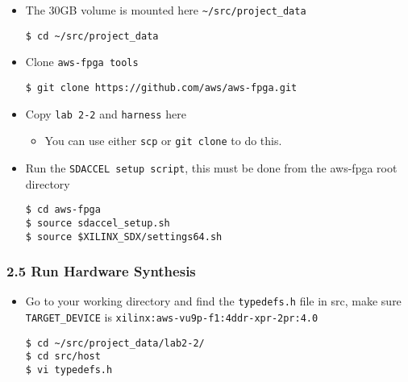 \documentclass[]{article}
\begin{document}
\begin{itemize}
\item
  The 30GB volume is mounted here
  \texttt{\textasciitilde{}/src/project\_data}

\begin{verbatim}
$ cd ~/src/project_data
\end{verbatim}
\end{itemize}

\begin{itemize}
\item
  Clone \texttt{aws-fpga\ tools}

\begin{verbatim}
$ git clone https://github.com/aws/aws-fpga.git
\end{verbatim}
\end{itemize}

\begin{itemize}
\item
  Copy \texttt{lab\ 2-2} and \texttt{harness} here

  \begin{itemize}
  \item
    You can use either \texttt{scp} or \texttt{git\ clone} to do this.
  \end{itemize}
\item
  Run the \texttt{SDACCEL\ setup\ script}, this must be done from the
  aws-fpga root directory

\begin{verbatim}
$ cd aws-fpga
$ source sdaccel_setup.sh
$ source $XILINX_SDX/settings64.sh
\end{verbatim}
\end{itemize}

\hypertarget{header-n299}{%
\subsubsection{2.5 Run Hardware Synthesis}\label{header-n299}}

\begin{itemize}
\item
  Go to your working directory and find the \texttt{typedefs.h} file in
  src, make sure \texttt{TARGET\_DEVICE} is
  \texttt{xilinx:aws-vu9p-f1:4ddr-xpr-2pr:4.0}

\begin{verbatim}
$ cd ~/src/project_data/lab2-2/
$ cd src/host
$ vi typedefs.h
\end{verbatim}
\end{itemize}
\end{document}
